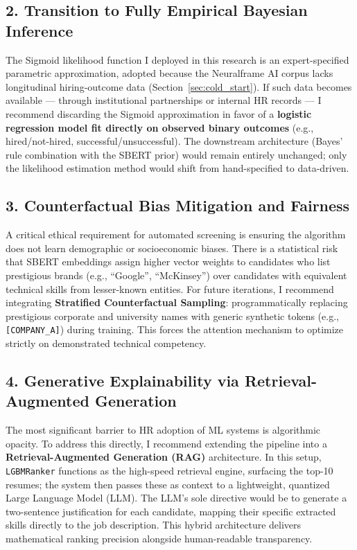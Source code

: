 \subsection{2. Transition to Fully Empirical Bayesian Inference}
The Sigmoid likelihood function I deployed in this research is an expert-specified parametric approximation, adopted because the Neuralframe AI corpus lacks longitudinal hiring-outcome data (Section~\ref{sec:cold_start}). If such data becomes available --- through institutional partnerships or internal HR records --- I recommend discarding the Sigmoid approximation in favor of a \textbf{logistic regression model fit directly on observed binary outcomes} (e.g., hired/not-hired, successful/unsuccessful). The downstream architecture (Bayes' rule combination with the SBERT prior) would remain entirely unchanged; only the likelihood estimation method would shift from hand-specified to data-driven.

\subsection{3. Counterfactual Bias Mitigation and Fairness}
A critical ethical requirement for automated screening is ensuring the algorithm does not learn demographic or socioeconomic biases. There is a statistical risk that SBERT embeddings assign higher vector weights to candidates who list prestigious brands (e.g., ``Google'', ``McKinsey'') over candidates with equivalent technical skills from lesser-known entities. For future iterations, I recommend integrating \textbf{Stratified Counterfactual Sampling}: programmatically replacing prestigious corporate and university names with generic synthetic tokens (e.g., \texttt{[COMPANY\_A]}) during training. This forces the attention mechanism to optimize strictly on demonstrated technical competency.

\subsection{4. Generative Explainability via Retrieval-Augmented Generation}
The most significant barrier to HR adoption of ML systems is algorithmic opacity. To address this directly, I recommend extending the pipeline into a \textbf{Retrieval-Augmented Generation (RAG)} architecture. In this setup, \texttt{LGBMRanker} functions as the high-speed retrieval engine, surfacing the top-10 resumes; the system then passes these as context to a lightweight, quantized Large Language Model (LLM). The LLM's sole directive would be to generate a two-sentence justification for each candidate, mapping their specific extracted skills directly to the job description. This hybrid architecture delivers mathematical ranking precision alongside human-readable transparency.

